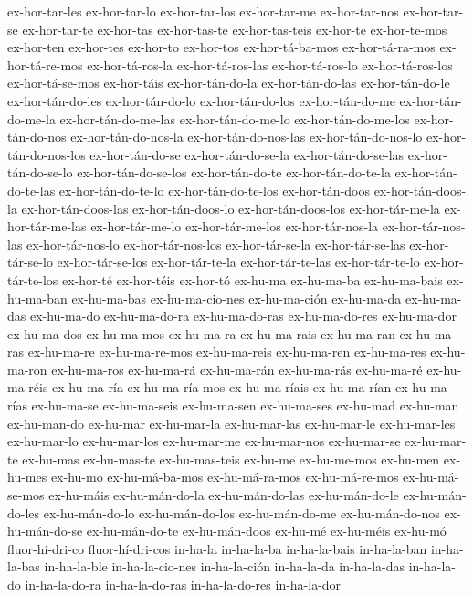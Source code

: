 {ex-hor-tar-les
ex-hor-tar-lo
ex-hor-tar-los
ex-hor-tar-me
ex-hor-tar-nos
ex-hor-tar-se
ex-hor-tar-te
ex-hor-tas
ex-hor-tas-te
ex-hor-tas-teis
ex-hor-te
ex-hor-te-mos
ex-hor-ten
ex-hor-tes
ex-hor-to
ex-hor-tos
ex-hor-tá-ba-mos
ex-hor-tá-ra-mos
ex-hor-tá-re-mos
ex-hor-tá-ros-la
ex-hor-tá-ros-las
ex-hor-tá-ros-lo
ex-hor-tá-ros-los
ex-hor-tá-se-mos
ex-hor-táis
ex-hor-tán-do-la
ex-hor-tán-do-las
ex-hor-tán-do-le
ex-hor-tán-do-les
ex-hor-tán-do-lo
ex-hor-tán-do-los
ex-hor-tán-do-me
ex-hor-tán-do-me-la
ex-hor-tán-do-me-las
ex-hor-tán-do-me-lo
ex-hor-tán-do-me-los
ex-hor-tán-do-nos
ex-hor-tán-do-nos-la
ex-hor-tán-do-nos-las
ex-hor-tán-do-nos-lo
ex-hor-tán-do-nos-los
ex-hor-tán-do-se
ex-hor-tán-do-se-la
ex-hor-tán-do-se-las
ex-hor-tán-do-se-lo
ex-hor-tán-do-se-los
ex-hor-tán-do-te
ex-hor-tán-do-te-la
ex-hor-tán-do-te-las
ex-hor-tán-do-te-lo
ex-hor-tán-do-te-los
ex-hor-tán-doos
ex-hor-tán-doos-la
ex-hor-tán-doos-las
ex-hor-tán-doos-lo
ex-hor-tán-doos-los
ex-hor-tár-me-la
ex-hor-tár-me-las
ex-hor-tár-me-lo
ex-hor-tár-me-los
ex-hor-tár-nos-la
ex-hor-tár-nos-las
ex-hor-tár-nos-lo
ex-hor-tár-nos-los
ex-hor-tár-se-la
ex-hor-tár-se-las
ex-hor-tár-se-lo
ex-hor-tár-se-los
ex-hor-tár-te-la
ex-hor-tár-te-las
ex-hor-tár-te-lo
ex-hor-tár-te-los
ex-hor-té
ex-hor-téis
ex-hor-tó
ex-hu-ma
ex-hu-ma-ba
ex-hu-ma-bais
ex-hu-ma-ban
ex-hu-ma-bas
ex-hu-ma-cio-nes
ex-hu-ma-ción
ex-hu-ma-da
ex-hu-ma-das
ex-hu-ma-do
ex-hu-ma-do-ra
ex-hu-ma-do-ras
ex-hu-ma-do-res
ex-hu-ma-dor
ex-hu-ma-dos
ex-hu-ma-mos
ex-hu-ma-ra
ex-hu-ma-rais
ex-hu-ma-ran
ex-hu-ma-ras
ex-hu-ma-re
ex-hu-ma-re-mos
ex-hu-ma-reis
ex-hu-ma-ren
ex-hu-ma-res
ex-hu-ma-ron
ex-hu-ma-ros
ex-hu-ma-rá
ex-hu-ma-rán
ex-hu-ma-rás
ex-hu-ma-ré
ex-hu-ma-réis
ex-hu-ma-ría
ex-hu-ma-ría-mos
ex-hu-ma-ríais
ex-hu-ma-rían
ex-hu-ma-rías
ex-hu-ma-se
ex-hu-ma-seis
ex-hu-ma-sen
ex-hu-ma-ses
ex-hu-mad
ex-hu-man
ex-hu-man-do
ex-hu-mar
ex-hu-mar-la
ex-hu-mar-las
ex-hu-mar-le
ex-hu-mar-les
ex-hu-mar-lo
ex-hu-mar-los
ex-hu-mar-me
ex-hu-mar-nos
ex-hu-mar-se
ex-hu-mar-te
ex-hu-mas
ex-hu-mas-te
ex-hu-mas-teis
ex-hu-me
ex-hu-me-mos
ex-hu-men
ex-hu-mes
ex-hu-mo
ex-hu-má-ba-mos
ex-hu-má-ra-mos
ex-hu-má-re-mos
ex-hu-má-se-mos
ex-hu-máis
ex-hu-mán-do-la
ex-hu-mán-do-las
ex-hu-mán-do-le
ex-hu-mán-do-les
ex-hu-mán-do-lo
ex-hu-mán-do-los
ex-hu-mán-do-me
ex-hu-mán-do-nos
ex-hu-mán-do-se
ex-hu-mán-do-te
ex-hu-mán-doos
ex-hu-mé
ex-hu-méis
ex-hu-mó
fluor-hí-dri-co
fluor-hí-dri-cos
in-ha-la
in-ha-la-ba
in-ha-la-bais
in-ha-la-ban
in-ha-la-bas
in-ha-la-ble
in-ha-la-cio-nes
in-ha-la-ción
in-ha-la-da
in-ha-la-das
in-ha-la-do
in-ha-la-do-ra
in-ha-la-do-ras
in-ha-la-do-res
in-ha-la-dor
}
